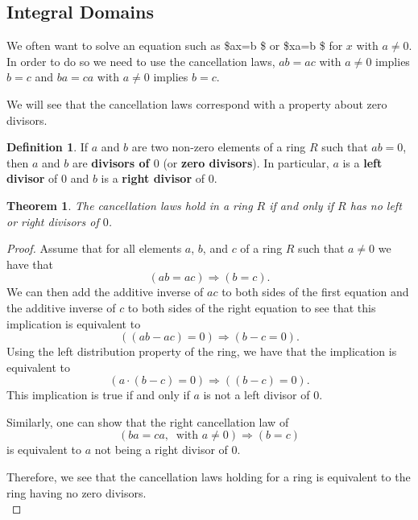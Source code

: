 \documentclass[
]{book}
\newtheorem{theorem}{Theorem}[chapter]
\theoremstyle{definition}
\newtheorem{definition}{Definition}[chapter]
\theoremstyle{definition}
\theoremstyle{definition}
\theoremstyle{remark}
\begin{document}
\hypertarget{integral-domains}{%
\subsection{Integral Domains}\label{integral-domains}}

We often want to solve an equation such as \$ax=b \$ or \$xa=b \$ for \(x\) with \(a\neq 0\). In order to do so we need to use the cancellation laws, \(ab=ac\) with \(a \neq 0\) implies \(b=c\) and \(ba=ca\) with \(a\neq 0\) implies \(b=c\).

We will see that the cancellation laws correspond with a property about zero divisors.

\begin{definition}
\protect\hypertarget{def:unnamed-chunk-173}{}{\label{def:unnamed-chunk-173} }If \(a\) and \(b\) are two non-zero elements of a ring \(R\) such that \(ab=0\), then \(a\) and \(b\) are \textbf{divisors of \(0\)} (or \textbf{zero divisors}). In particular, \(a\) is a \textbf{left divisor} of \(0\) and \(b\) is a \textbf{right divisor} of \(0\).
\end{definition}

\begin{theorem}
\protect\hypertarget{thm:unnamed-chunk-174}{}{\label{thm:unnamed-chunk-174} }The cancellation laws hold in a ring \(R\) if and only if \(R\) has no left or right divisors of \(0\).
\end{theorem}

\begin{proof}
{}Assume that for all elements \(a\), \(b\), and \(c\) of a ring \(R\) such that \(a\neq 0\) we have that
\[(ab=ac) \Rightarrow (b=c).\] We can then add the additive inverse of \(ac\) to both sides of the first equation and the additive inverse of \(c\) to both sides of the right equation to see that this implication is equivalent to \[\left((ab-ac)=0 \right) \Rightarrow (b-c=0).\] Using the left distribution property of the ring, we have that the implication is equivalent to \[\left( a \cdot (b-c) =0\right) \Rightarrow \left( (b-c)=0\right).\] This implication is true if and only if \(a\) is not a left divisor of \(0\).

Similarly, one can show that the right cancellation law of \[\left(ba=ca, \: \mbox{ with } a \neq 0 \right) \Rightarrow (b=c)\] is equivalent to \(a\) not being a right divisor of \(0\).

Therefore, we see that the cancellation laws holding for a ring is equivalent to the ring having no zero divisors.\\
\end{proof}
\end{document}
